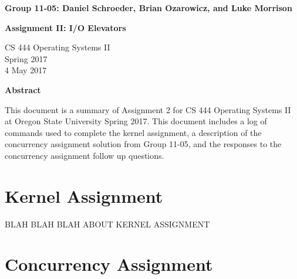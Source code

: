 \documentclass[10pt,letterpaper,draftclsnofoot,onecolumn]{IEEEtran}
\begin{document}
\begin{titlepage}
    \begin{center}
        \vspace*{3.5cm}

        \textbf{Group 11-05: Daniel Schroeder, Brian Ozarowicz, and Luke Morrison}

        \vspace{0.5cm}

        \textbf{Assignment II: I/O Elevators}

        \vspace{0.8cm}

        CS 444 Operating Systems II\\
        Spring 2017\\
        4 May 2017\\

        \vspace{1cm}

        \textbf{Abstract}\\

        \vspace{0.5cm}
			
			This document is a summary of Assignment 2 for CS 444 Operating Systems II at Oregon State University Spring 2017. This document includes a log of commands used to complete the kernel assignment, a description of the concurrency assignment solution from Group 11-05, and the responses to the concurrency assignment follow up questions.\\

        \vfill

    \end{center}
\end{titlepage}


\section{Kernel Assignment}
\bigskip

BLAH BLAH BLAH ABOUT KERNEL ASSIGNMENT\\



\pagebreak

\section{Concurrency Assignment}
\bigskip
\end{document}
